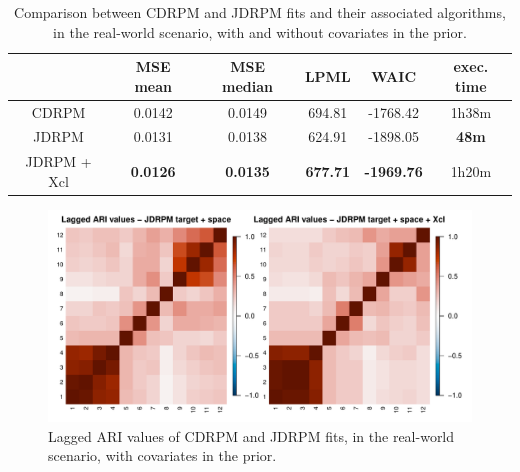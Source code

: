 \documentclass[12pt,	%
	a4paper,		%
	twoside,		%
	openright,		%
	titlepage,%
	]{book}
\theoremstyle{definition}
\begin{document}
\begin{table}[!ht]
    \caption[Comparison of CDRPM and JDRPM, real-world scenario, covariates in the prior]{Comparison between CDRPM and JDRPM fits and their associated algorithms, in the real-world scenario, with and without covariates in the prior.}
    \centering
    \begin{tabular}{cccccc}
    \toprule
           & MSE mean &  MSE median & LPML & WAIC & exec. time  \\
           \midrule
        CDRPM &   0.0142   & 0.0149   &  694.81 & -1768.42 & 1h38m\\
        JDRPM & 0.0131  & 0.0138   & 624.91 & -1898.05  &  \textbf{48m}\\
        JDRPM + Xcl & \textbf{0.0126}  & \textbf{0.0135}  & \textbf{677.71} & \textbf{-1969.76}  &  1h20m\\
        \bottomrule
    \end{tabular}
    \label{tab: fits metrics space all with also Xcl}
\end{table}

\begin{figure}[!ht]
    \centering
    \includegraphics[width=1\linewidth]{Testing/Covariates/in clustering/ari_sp_vs_Xcl.pdf}
    \caption[Lagged ARI values of JDRPM fits, in the real-world scenario, with covariates in the prior.]{Lagged ARI values of CDRPM and JDRPM fits, in the real-world scenario, with covariates in the prior.}
    \label{fig: Jxcl ari values plot}
\end{figure}
\end{document}
